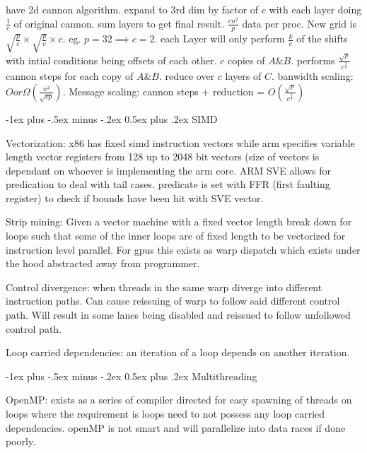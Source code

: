 \documentclass[letter,8pt,landscape]{article}
\makeatletter
\renewcommand{\section}{\@startsection{section}{1}{0mm}%
                                {-1ex plus -.5ex minus -.2ex}%
                                {0.5ex plus .2ex}%
                                {\normalfont\large\bfseries}}
\makeatother
\begin{document}
\begin{multicols}{3}
  have 2d cannon algorithm. expand to 3rd dim by factor of $c$
  with each layer doing $\frac{1}{c}$ of original cannon. sum layers to get
  final result. $\frac{cn^2}{p}$ data per proc. New grid is $\sqrt{\frac{p}{c}}
  \times \sqrt{\frac{p}{c}}\times c$. eg. $p=32 \implies c=2$. each Layer will
  only perform $\frac{k}{c}$ of the shifts with intial conditions being offsets
  of each other. $c$ copies of $A \& B$. performs
  $\frac{\sqrt{p}}{c^\frac{3}{2}}$ cannon steps for each copy of $A \& B$.
  reduce over $c$ layers of $C$. banwidth scaling: $O or \Omega
  (\frac{n^2}{\sqrt{cp}})$. Message scaling: cannon steps + reduction = 
  $O(\frac{\sqrt{p}}{c^{\frac{3}{2}}})$

  \section{SIMD}

  Vectorization: x86 has fixed simd instruction vectors while arm specifies
  variable length vector registers from 128 up to 2048 bit vectors  (size of
  vectors is dependant on whoever is implementing the arm core. ARM SVE allows for
  predication to deal with tail cases. predicate is set with FFR (first faulting
  register) to check if bounds have been hit with SVE vector.

  Strip mining: Given a vector machine with a fixed vector length break down for
  loops such that some of the inner loops are of fixed length to be vectorized
  for instruction level parallel. For gpus this exists as warp dispatch which
  exists under the hood abstracted away from programmer.

  Control divergence: when threads in the same warp diverge into different
  instruction paths. Can cause reissuing of warp to follow said different
  control path. Will result in some lanes being disabled and reissued to follow
  unfollowed control path.

  Loop carried dependencies: an iteration of a loop depends on another
  iteration.

  \section{Multithreading}

  OpenMP: exists as a series of compiler directed for easy spawning of threads
  on loops where the requirement is loops need to not possess any loop carried
  dependencies. openMP is not smart and will parallelize into data races if done
  poorly. 


\end{multicols}
\end{document}
